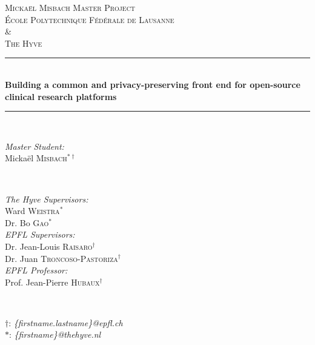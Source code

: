 \begin{titlepage}

\newcommand{\HRule}{\rule{\linewidth}{0.5mm}}
\center
 
\textsc{\LARGE Mickaël Misbach Master Project}\\[0.5cm]

\textsc{\Large École Polytechnique Fédérale de Lausanne}\\ 
\textsc{\Large \&}\\ 
\textsc{\Large The Hyve}\\[0.5cm] 

\HRule \\[0.4cm]
{ \huge \bfseries Building a common and privacy-preserving front end for open-source clinical research platforms}\\[0.4cm]
\HRule \\[1cm]
 
\begin{minipage}{0.4\textwidth}
\begin{flushleft} \large
\emph{Master Student:}\\
Mickaël \textsc{Misbach}$^{*\dagger}$\\
\end{flushleft}
\end{minipage}
~
\begin{minipage}{0.4\textwidth}
\begin{flushright} \large
\emph{The Hyve Supervisors:} \\
Ward \textsc{Weistra}$^*$\\
Dr. Bo \textsc{Gao}$^*$\\[\baselineskip]
\emph{EPFL Supervisors:} \\
Dr. Jean-Louis \textsc{Raisaro}$^\dagger$\\
Dr. Juan \textsc{Troncoso-Pastoriza}$^\dagger$\\[\baselineskip]
\emph{EPFL Professor:} \\
Prof. Jean-Pierre \textsc{Hubaux}$^\dagger$\\
\end{flushright}
\end{minipage}
~ \\[0.5cm]
\begin{minipage}{1\textwidth}
\begin{flushbottom}
\centering\small
$\dagger$: \emph{\{firstname.lastname\}@epfl.ch} \\
$*$: \emph{\{firstname\}@thehyve.nl} \\
\end{flushbottom}
\end{minipage}\\[2cm]



\end{titlepage}
